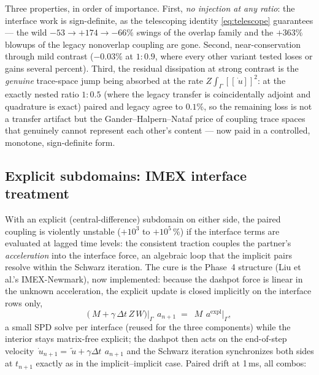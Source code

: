 \documentclass[11pt]{article}
\newcommand{\jump}[1]{[\![#1]\!]}
\begin{document}
Three properties, in order of importance. First, \emph{no injection at any
ratio}: the interface work is sign-definite, as the telescoping identity
\eqref{eq:telescope} guarantees --- the wild $-53 \to +174 \to -66\%$ swings
of the overlap family and the $+363\%$ blowups of the legacy nonoverlap
coupling are gone. Second, near-conservation through mild contrast
($-0.03\%$ at $1{:}0.9$, where every other variant tested loses or gains
several percent). Third, the residual dissipation at strong contrast is the
\emph{genuine} trace-space jump being absorbed at the rate
$Z\!\int_\Gamma \jump{\dot{~u}}^2$: at the exactly nested ratio $1{:}0.5$
(where the legacy transfer is coincidentally adjoint and quadrature is
exact) paired and legacy agree to $0.1\%$, so the remaining loss is not a
transfer artifact but the Gander--Halpern--Nataf price of coupling trace
spaces that genuinely cannot represent each other's content --- now paid in
a controlled, monotone, sign-definite form.

\subsection{Explicit subdomains: IMEX interface treatment}
\label{sec:imex}

With an explicit (central-difference) subdomain on either side, the paired
coupling is violently unstable ($+10^3$ to $+10^5\,\%$) if the interface
terms are evaluated at lagged time levels: the consistent traction couples
the partner's \emph{acceleration} into the interface force, an algebraic
loop that the implicit pairs resolve within the Schwarz iteration. The cure
is the Phase~4 structure (Liu et al.'s IMEX-Newmark), now implemented:
because the dashpot force is linear in the unknown acceleration, the
explicit update is closed implicitly on the interface rows only,
\begin{equation}
  \bigl(~M + \gamma\,\Delta t\,Z\,W\bigr)\big|_\Gamma\, ~a_{n+1}
  \;=\; ~M\,~a^{\mathrm{expl}}\big|_\Gamma,
  \label{eq:imex}
\end{equation}
a small SPD solve per interface (reused for the three components) while the
interior stays matrix-free explicit; the dashpot then acts on the
end-of-step velocity $\dot{~u}_{n+1} = \tilde{~u} + \gamma\Delta t\,~a_{n+1}$
and the Schwarz iteration synchronizes both sides at $t_{n+1}$ exactly as in
the implicit--implicit case. Paired drift at 1\,ms, all combos:
\end{document}
